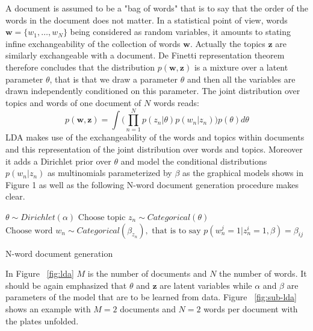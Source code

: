 \documentclass[12pt,a4paper,onecolumn]{article}
\begin{document}
A document is assumed to be a "bag of words" that is to say that the order of the words in the document does not matter. In a statistical point of view, words $\mathbf{w}=\{w_1,\dots,w_N\}$ being considered as random variables, it amounts to stating infine exchangeability of the collection of words $\mathbf{w}$. Actually the topics $\mathbf{z}$ are similarly exchangeable with a document. De Finetti representation theorem therefore concludes that the distribution $p(\mathbf{\mathbf{w}, \mathbf{z}})$ is a mixture over a latent parameter $\theta$, that is that we draw a parameter $\theta$ and then all the variables are drawn independently conditioned on this parameter. The joint distribution over topics and words of one document of $N$ words reads:
$$p(\mathbf{w}, \mathbf{z})=\int \Big(\prod_{n=1}^N p(z_n|\theta)p(w_n|z_n)\Big)p(\theta)d\theta$$
LDA makes use of the exchangeability of the words and topics within documents and this representation of the joint distribution over words and topics. Moreover it adds a Dirichlet prior over $\theta$ and model the conditional distributions $p(w_n|z_n)$ as multinomials parameterized by $\beta$ as the graphical models shows in Figure 1 as well as the following N-word document generation procedure makes clear.

\begin{algorithm}
  \begin{algorithmic}
    \State $\theta \sim Dirichlet(\alpha)$
      \State $\text{Choose topic } z_n \sim Categorical(\theta)$
      \State $\text{Choose word }w_n \sim Categorical(\beta_{z_n}), \text{ that is to say }p(w_n^j=1|z_n^i=1,\beta)=\beta_{ij}$
    \EndFor
  \end{algorithmic}
  \caption{N-word document generation}
  \label{alg:doc}
\end{algorithm}


{
}{}{}


In Figure ~\ref{fig:lda} $M$ is the number of documents and $N$ the number of words. It should be again emphasized that $\theta$ and $\mathbf{z}$ are latent variables while $\alpha$ and $\beta$ are parameters of the model that are to be learned from data. Figure ~\ref{fig:sub-lda} shows an example with $M=2$ documents and $N=2$ words per document with the plates unfolded.
\end{document}
